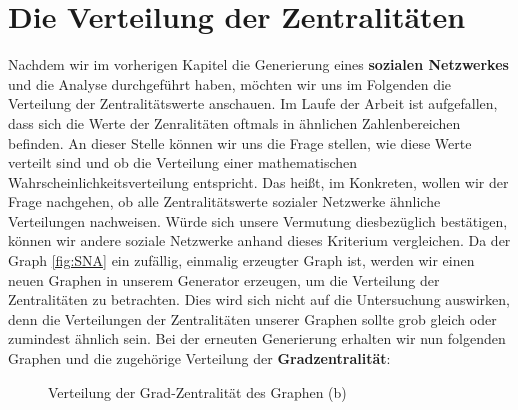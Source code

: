 \section{Die Verteilung der Zentralitäten}
Nachdem wir im vorherigen Kapitel die Generierung eines \textbf{sozialen Netzwerkes} und die Analyse durchgeführt haben, möchten wir uns im Folgenden die Verteilung der Zentralitätswerte anschauen.
Im Laufe der Arbeit ist aufgefallen, dass sich die Werte der Zenralitäten oftmals in ähnlichen Zahlenbereichen befinden. An dieser Stelle können wir uns die Frage stellen, wie diese Werte verteilt sind und ob die Verteilung einer mathematischen Wahrscheinlichkeitsverteilung entspricht. Das heißt, im Konkreten, wollen wir der Frage nachgehen, ob alle Zentralitätswerte sozialer Netzwerke ähnliche Verteilungen nachweisen. Würde sich unsere Vermutung diesbezüglich bestätigen, können wir andere soziale Netzwerke anhand dieses Kriterium vergleichen.
Da der Graph \ref{fig:SNA} ein zufällig, einmalig erzeugter Graph ist, werden wir einen neuen Graphen in unserem Generator erzeugen, um die Verteilung der Zentralitäten zu betrachten. Dies wird sich nicht auf die Untersuchung auswirken, denn die Verteilungen der Zentralitäten unserer Graphen sollte grob gleich oder zumindest ähnlich sein. Bei der erneuten Generierung erhalten wir nun folgenden Graphen und die zugehörige Verteilung der \textbf{Gradzentralität}:

\FloatBarrier
\begin{figure}[h!]%
  \centering
  \qquad
  \caption{Verteilung der Grad-Zentralität des Graphen (b)}%
  \label{fig:distribution}
\end{figure}
\FloatBarrier

